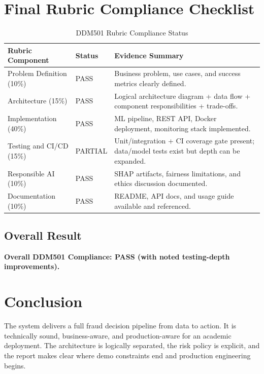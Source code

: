 \documentclass[11pt]{article}
\begin{document}
\section{Final Rubric Compliance Checklist}

\begin{table}[H]
\centering
\caption{DDM501 Rubric Compliance Status}
\begin{tabular}{p{5cm}p{2cm}p{7cm}}
\toprule
Rubric Component & Status & Evidence Summary \\
\midrule
Problem Definition (10\%) & PASS & Business problem, use cases, and success metrics clearly defined. \\
Architecture (15\%) & PASS & Logical architecture diagram + data flow + component responsibilities + trade-offs. \\
Implementation (40\%) & PASS & ML pipeline, REST API, Docker deployment, monitoring stack implemented. \\
Testing and CI/CD (15\%) & PARTIAL & Unit/integration + CI coverage gate present; data/model tests exist but depth can be expanded. \\
Responsible AI (10\%) & PASS & SHAP artifacts, fairness limitations, and ethics discussion documented. \\
Documentation (10\%) & PASS & README, API docs, and usage guide available and referenced. \\
\bottomrule
\end{tabular}
\end{table}

\subsection{Overall Result}
\textbf{Overall DDM501 Compliance: PASS (with noted testing-depth improvements).}

\section{Conclusion}
The system delivers a full fraud decision pipeline from data to action. It is technically sound, business-aware, and production-aware for an academic deployment. The architecture is logically separated, the risk policy is explicit, and the report makes clear where demo constraints end and production engineering begins.
\end{document}
